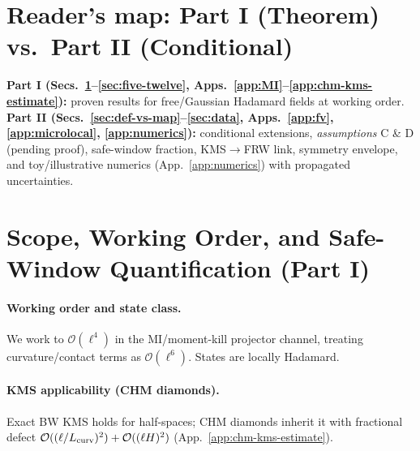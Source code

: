 \documentclass[aps,prd,onecolumn,superscriptaddress,nofootinbib]{revtex4-2}
\begin{document}
\maketitle

\section*{Reader’s map: Part I (Theorem) vs.\ Part II (Conditional)}
\noindent \textbf{Part I (Secs.~\ref{sec:scope}–\ref{sec:five-twelve}, Apps.~\ref{app:MI}–\ref{app:chm-kms-estimate}):} proven results for free/Gaussian Hadamard fields at working order.\\
\textbf{Part II (Secs.~\ref{sec:def-vs-map}–\ref{sec:data}, Apps.~\ref{app:fv}, \ref{app:microlocal}, \ref{app:numerics}):} conditional extensions, \emph{assumptions} C \& D (pending proof), safe-window fraction, KMS\(\to\)FRW link, symmetry envelope, and toy/illustrative numerics (App.~\ref{app:numerics}) with propagated uncertainties.

\section{Scope, Working Order, and Safe-Window Quantification (Part I)}
\label{sec:scope}

\paragraph{Working order and state class.} We work to \(\mathcal O(\ell^4)\) in the MI/moment-kill projector channel, treating curvature/contact terms as \(\mathcal O(\ell^6)\). States are locally Hadamard.

\paragraph{KMS applicability (CHM diamonds).} Exact BW KMS holds for half-spaces; CHM diamonds inherit it with fractional defect \(\mathcal O((\ell/L_{\rm curv})^2)+\mathcal O((\ell H)^2)\) (App.~\ref{app:chm-kms-estimate}).
\end{document}
